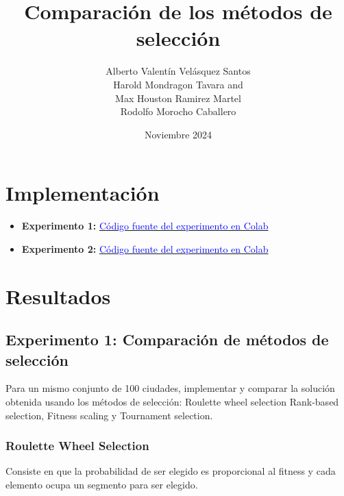 \documentclass[12pt]{article}
\begin{document}
        \title{Comparación de los métodos de selección}
        \author{
            Alberto Valentín Velásquez Santos \\
            Harold Mondragon Tavara and \\
            Max Houston Ramirez Martel \\
            Rodolfo Morocho Caballero \\
        }
            
        \date{Noviembre 2024}
        \maketitle
        \renewcommand{\contentsname}{Índice}  %
        \tableofcontents
        \setcounter{tocdepth}{3}

        \section{Implementación}
        \begin{itemize}
            \item \textbf{Experimento 1:} 
            \href{https://colab.research.google.com/drive/1S57At2Zv09vkb5BnqWQWhOzGMQPR1V_f?usp=sharing}{\textcolor{blue}{Código fuente del experimento en Colab}}
            
            \item \textbf{Experimento 2:} 
            \href{https://colab.research.google.com/drive/1DwuVdfqbHCSGKmwRBW1Oex84BFJMk7Mc?usp=sharing}{\textcolor{blue}{Código fuente del experimento en Colab}}
        \end{itemize}
        \section{Resultados}
            \subsection[Experimento 1]{Experimento 1: Comparación de métodos de selección}
                Para un mismo conjunto de 100 ciudades, implementar y comparar la solución obtenida usando los métodos de selección: Roulette wheel selection Rank-based selection, Fitness scaling y Tournament selection.
                \subsubsection[Roulette Wheel Selection]{Roulette Wheel Selection}
                    Consiste en que la probabilidad de ser elegido es proporcional al fitness y cada elemento ocupa un segmento para ser elegido.
                
\end{document}
